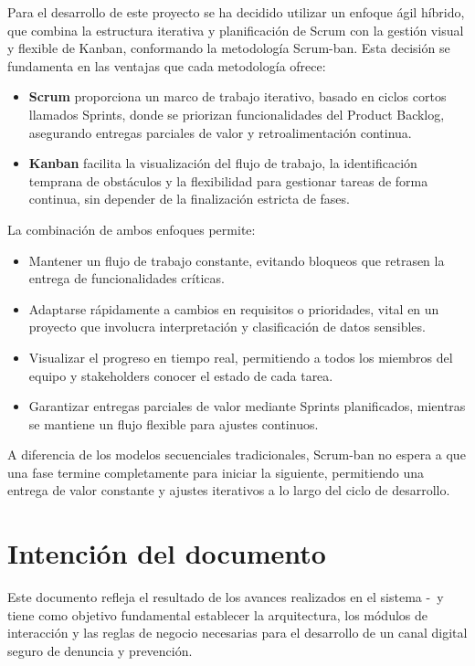         Para el desarrollo de este proyecto se ha decidido utilizar un enfoque ágil híbrido, que combina la estructura iterativa y planificación de Scrum con la gestión visual y flexible de Kanban, conformando la metodología Scrum-ban. Esta decisión se fundamenta en las ventajas que cada metodología ofrece:
        \begin{itemize}
            \item \textbf{Scrum} proporciona un marco de trabajo iterativo, basado en ciclos cortos llamados Sprints, donde se priorizan funcionalidades del Product Backlog, asegurando entregas parciales de valor y retroalimentación continua.
            \item \textbf{Kanban} facilita la visualización del flujo de trabajo, la identificación temprana de obstáculos y la flexibilidad para gestionar tareas de forma continua, sin depender de la finalización estricta de fases.
        \end{itemize}
        La combinación de ambos enfoques permite:
        \begin{itemize}
            \item Mantener un flujo de trabajo constante, evitando bloqueos que retrasen la entrega de funcionalidades críticas.
            \item Adaptarse rápidamente a cambios en requisitos o prioridades, vital en un proyecto que involucra interpretación y clasificación de datos sensibles.
            \item Visualizar el progreso en tiempo real, permitiendo a todos los miembros del equipo y stakeholders conocer el estado de cada tarea.
            \item Garantizar entregas parciales de valor mediante Sprints planificados, mientras se mantiene un flujo flexible para ajustes continuos.
        \end{itemize}
        A diferencia de los modelos secuenciales tradicionales, Scrum-ban no espera a que una fase termine completamente para iniciar la siguiente, permitiendo una entrega de valor constante y ajustes iterativos a lo largo del ciclo de desarrollo.

    \section{Intención del documento}

        Este documento refleja el resultado de los avances realizados en el sistema \varCveSistema-\varSistema\ y tiene como objetivo fundamental establecer la arquitectura, los módulos de interacción y las reglas de negocio necesarias para el desarrollo de un canal digital seguro de denuncia y prevención.

